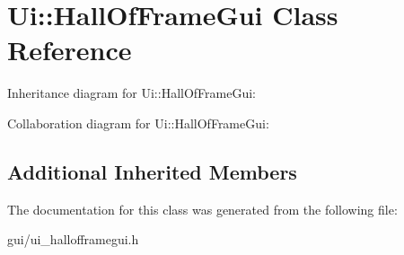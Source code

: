 \hypertarget{class_ui_1_1_hall_of_frame_gui}{}\section{Ui\+:\+:Hall\+Of\+Frame\+Gui Class Reference}
\label{class_ui_1_1_hall_of_frame_gui}


Inheritance diagram for Ui\+:\+:Hall\+Of\+Frame\+Gui\+:


Collaboration diagram for Ui\+:\+:Hall\+Of\+Frame\+Gui\+:
\subsection*{Additional Inherited Members}


The documentation for this class was generated from the following file\+:\begin{DoxyCompactItemize}
\item 
gui/ui\+\_\+hallofframegui.\+h\end{DoxyCompactItemize}
